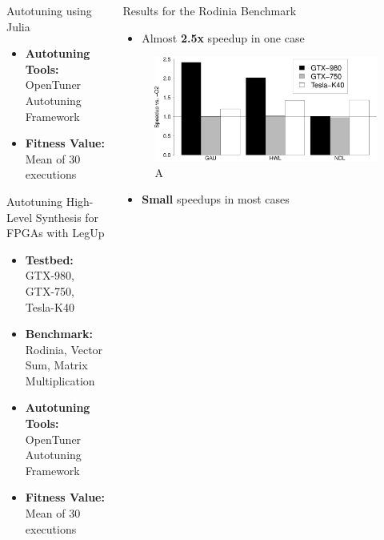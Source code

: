 \documentclass{beamer}
\begin{document}
\begin{frame}
\begin{columns}[t]
\begin{column}{.46\linewidth}
\begin{block}{\Large Autotuning using Julia}
\begin{itemize}
                \item \textbf{Autotuning Tools:} OpenTuner Autotuning Framework
                \item \textbf{Fitness Value:} Mean of 30 executions
            \end{itemize}
        \end{block}
        \begin{block}{\Large Autotuning High-Level Synthesis for FPGAs with LegUp}
            \large
            \begin{itemize}
                \item \textbf{Testbed:} GTX-980, GTX-750, Tesla-K40
                \item \textbf{Benchmark:} Rodinia, Vector Sum, Matrix Multiplication
                \item \textbf{Autotuning Tools:} OpenTuner Autotuning Framework
                \item \textbf{Fitness Value:} Mean of 30 executions
            \end{itemize}
        \end{block}
    \end{column}
    \begin{column}{.46\linewidth}
        \begin{block}{\Large Results for the Rodinia Benchmark}
            \begin{itemize}
                \item \large{Almost \textbf{2.5x} speedup in one case}
            \end{itemize}
            \begin{figure}[htpb]
                \includegraphics[width=0.84\linewidth]{RodiniaSummary.eps}
                \caption{A}
            \end{figure}
            \begin{itemize}
                \item \large{\textbf{Small} speedups in most cases}
            \end{itemize}

\end{block}
\end{column}
\end{columns}
\end{frame}
\end{document}
